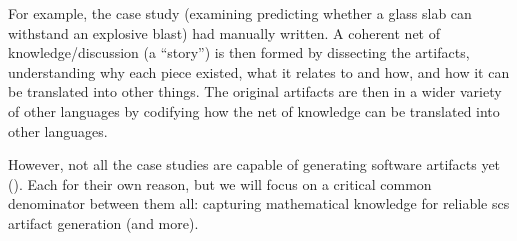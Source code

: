 For example, the  case study (examining predicting whether a glass
slab can withstand an explosive blast) had 
manually written. A coherent net of knowledge/discussion (a ``story'') is then
formed by dissecting the artifacts, understanding why each piece existed, what
it relates to and how, and how it can be translated into other things. The
original artifacts are then
in a wider variety of other languages by codifying how the net of knowledge can
be translated into other languages.

However, not all the case studies are capable of generating software artifacts
yet (). Each for their own reason, but we will focus
on a critical common denominator between them all: capturing mathematical
knowledge for reliable \acs{scs} artifact generation (and more).

